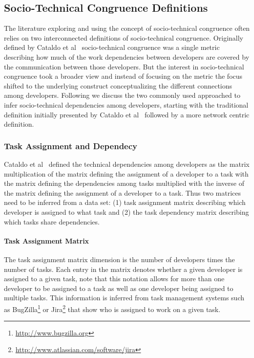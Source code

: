 \subsection{Socio-Technical Congruence Definitions}
The literature exploring and using the concept of socio-technical congruence often relies on two interconnected definitions of socio-technical congruence.
Originally defined by Cataldo et al~\cite{cataldo:cscw:2006} socio-technical congruence was a single metric describing how much of the work dependencies between developers are covered by the communication between those developers.
But the interest in socio-technical congruence took a broader view and instead of focusing on the metric the focus shifted to the underlying construct conceptualizing the different connections among developers.
Following we discuss the two commonly used approached to infer socio-technical dependencies among developers, starting with the traditional definition initially presented by Cataldo et al~\cite{cataldo:cscw:2006} followed by a more network centric definition.

\subsubsection{Task Assignment and Dependecy}
Cataldo et al~\cite{cataldo:cscw:2006} defined the technical dependencies among developers as the matrix multiplication of the matrix defining the assignment of a developer to a task with the matrix defining the dependencies among tasks multiplied with the inverse of the matrix defining the assignment of a developer to a task.
Thus two matrices need to be inferred from a data set: (1) task assignment matrix describing which developer is assigned to what task and (2) the task dependency matrix describing which tasks share dependencies.

\paragraph{Task Assignment Matrix}
The task assignment matrix dimension is the number of developers times the number of tasks.
Each entry in the matrix denotes whether a given developer is assigned to a given task, note that this notation allows for more than one developer to be assigned to a task as well as one developer being assigned to multiple tasks.
This information is inferred from task management systems such as BugZilla\footnote{\url{http://www.bugzilla.org}} or Jira\footnote{\url{http://www.atlassian.com/software/jira}} that show who is assigned to work on a given task.

